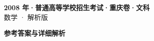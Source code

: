 \documentclass[zihao=-4, a4paper]{ctexart}
\begin{document}
\begin{center}
  {\Large\bfseries 2008 年·普通高等学校招生考试·重庆卷·文科}\\[4pt]
  {\large 数学 · 解析版}
\end{center}
\medskip
{}

\clearpage
{}
\begin{center}{\Large\bfseries 参考答案与详细解析}\end{center}
\medskip

\end{document}
